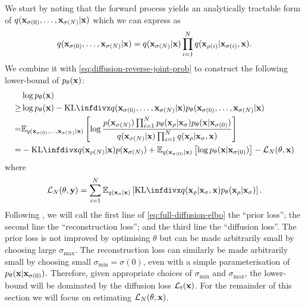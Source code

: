 We start by noting that the forward process yields an analytically tractable form of $q({\mathbf{x}}_{\sigma(0)},\ldots,{\mathbf{x}}_{\sigma(N)}|{\mathbf{x}})$ which we can express as
\begin{equation}
    q({\mathbf{x}}_{\sigma(0)},\ldots,{\mathbf{x}}_{\sigma(N)}|{\mathbf{x}}) = q({\mathbf{x}}_{\sigma(N)}|{\mathbf{x}}) \prod_{i=1}^N q({\mathbf{x}}_{\rho(i)} | {\mathbf{x}}_{\sigma(i)}, {\mathbf{x}}).
\end{equation}We combine it with \cref{eq:diffusion-reverse-joint-prob} to construct the following lower-bound of $p_\theta({\mathbf{x}})$:
\begin{align}
    &\log p_\theta(\rvx) \\
    \geq &\log p_\theta(\rvx) - \kl{q(\rvx_{\sigma(0)},\ldots,\rvx_{\sigma(N)}|\rvx)}{p_\theta(\rvx_{\sigma(0)},\ldots,\rvx_{\sigma(N)}|\rvx)} \\
    = &\EX_{q(\rvx_{\sigma(0)},\ldots,\rvx_{\sigma(N)}|\rvx)} \left[ \log \frac{p(\rvx_{\sigma(N)}) \prod_{i=1}^N p_\theta(\rvx_{\rho} | \rvx_{\sigma}) p_\theta(\rvx|\rvx_{\sigma(0)}) }{q(\rvx_{\sigma(N)}|\rvx) \prod_{i=1}^N q(\rvx_{\rho} | \rvx_{\sigma}, \rvx)} \right] \\
    = &-\kl{q(\rvx_{\rho(N)}|\rvx)}{p(\rvx_{\sigma(N)})} + \EX_{q(\rvx_{\sigma(0)}|\rvx)} \left[ \log p_\theta(\rvx|\rvx_{\sigma(0)}) \right] - \mathcal{L}_N(\theta, \rvx) \label{eq:full-diffusion-elbo}
\end{align}
where
\begin{align}
    \mathcal{L}_N(\theta, \rvy) = \sum_{i=1}^N \EX_{q(\rvx_{\sigma}|\rvx)} \left[ \kl{q(\rvx_{\rho} | \rvx_{\sigma}, \rvx)}{p_\theta(\rvx_{\rho} | \rvx_{\sigma})} \right].
\end{align}
Following \citet{kingma2021variational}, we will call the first line of \cref{eq:full-diffusion-elbo} the ``prior loss''; the second line the ``reconstruction loss''; and the third line the ``diffusion loss''. The prior loss is not improved by optimising $\theta$ but can be made arbitrarily small by choosing large $\sigma_\text{max}$. The reconstruction loss can similarly be made arbitrarily small by choosing small $\sigma_\text{min}=\sigma(0)$, even with a simple parameterisation of $p_\theta({\mathbf{x}}|{\mathbf{x}}_{\sigma(0)})$. Therefore, given appropriate choices of $\sigma_\text{min}$ and $\sigma_\text{max}$, the lower-bound will be dominated by the diffusion loss $\mathcal{L}_t({\mathbf{x}})$. For the remainder of this section we will focus on estimating $\mathcal{L}_N(\theta, {\mathbf{x}})$.

